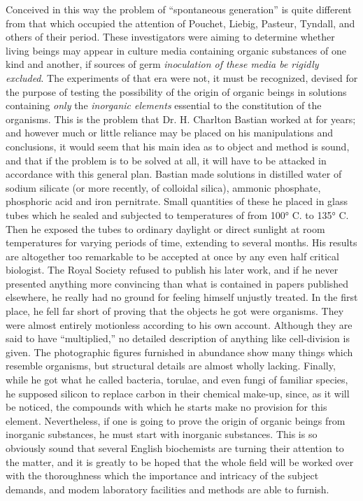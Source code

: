 \documentclass[a4paper, 11pt, oneside, polutonikogreek, english, landscape]{article}
\begin{document}
Conceived in this way the problem of ``spontaneous generation'' is quite different from that which occupied the attention of Pouchet, Liebig, Pasteur, Tyndall, and others of their period. These investigators were aiming to determine whether living beings may appear in culture media containing organic substances of one kind and another, if sources of germ \emph{inoculation of these media be rigidly excluded}. The experiments of that era were not, it must be recognized, devised for the purpose of testing the possibility of the origin of organic beings in solutions containing \emph{only} the \emph{inorganic elements} essential to the constitution of the organisms. This is the problem that Dr. H. Charlton Bastian worked at for years; and however much or little reliance may be placed on his manipulations and conclusions, it would seem that his main idea as to object and method is sound, and that if the problem is to be solved at all, it will have to be attacked in accordance with this general plan. Bastian made solutions in distilled water of sodium silicate (or more recently, of colloidal silica), ammonic phosphate, phosphoric acid and iron pernitrate. Small quantities of these he placed in glass tubes which he sealed and subjected to temperatures of from 100° C. to 135° C. Then he exposed the tubes to ordinary daylight or direct sunlight at room temperatures for varying periods of time, extending to several months. His results are altogether too remarkable to be accepted at once by any even half critical biologist. The Royal Society refused to publish his later work, and if he never presented anything more convincing than what is contained in papers published elsewhere, he really had no ground for feeling himself unjustly treated. In the first place, he fell far short of proving that the objects he got were organisms. They were almost entirely motionless according to his own account. Although they are said to have ``multiplied,'' no detailed description of anything like cell-division is given. The photographic figures furnished in abundance show many things which resemble organisms, but structural details are almost wholly lacking. Finally, while he got what he called bacteria, torulae, and even fungi of familiar species, he supposed silicon to replace carbon in their chemical make-up, since, as it will be noticed, the compounds with which he starts make no provision for this element. Nevertheless, if one is going to prove the origin of organic beings from inorganic substances, he must start with inorganic substances. This is so obviously sound that several English biochemists are turning their attention to the matter, and it is greatly to be hoped that the whole field will be worked over with the thoroughness which the importance and intricacy of the subject demands, and modem laboratory facilities and methods are able to furnish.
\end{document}
